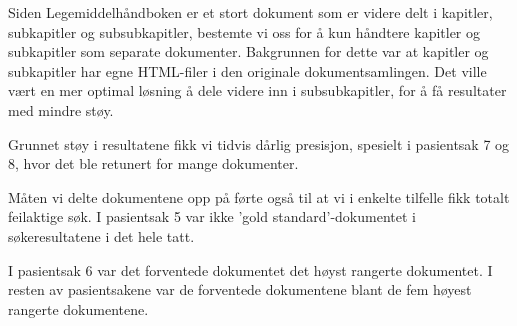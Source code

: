 \newline
Siden Legemiddelhåndboken er et stort dokument som er videre delt i kapitler, subkapitler og subsubkapitler, bestemte vi oss for å kun håndtere kapitler og subkapitler som separate dokumenter. Bakgrunnen for dette var at kapitler og subkapitler har egne HTML-filer i den originale dokumentsamlingen. Det ville vært en mer optimal løsning å dele videre inn i subsubkapitler, for å få resultater med mindre støy. 

Grunnet støy i resultatene fikk vi tidvis dårlig presisjon, spesielt i pasientsak 7 og 8, hvor det ble retunert for mange dokumenter. 

Måten vi delte dokumentene opp på førte også til at vi i enkelte tilfelle fikk totalt feilaktige søk. I pasientsak 5 var ikke 'gold standard'-dokumentet i søkeresultatene i det hele tatt. 

I pasientsak 6 var det forventede dokumentet det høyst rangerte dokumentet. 
I resten av pasientsakene var de forventede dokumentene blant de fem høyest rangerte dokumentene. 



